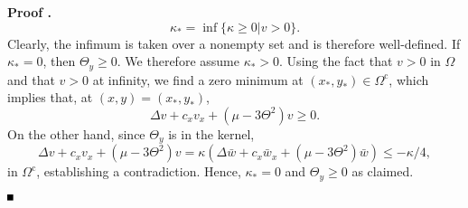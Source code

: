 \documentclass[10pt]{article}
\newenvironment{Proof}[1][\unskip]%
 {\begin{trivlist} \item[]{\bf Proof #1. }}%
 {\hspace*{\fill}$\rule{.4\baselineskip}{.4\baselineskip}$\end{trivlist}}
\renewcommand{\leq}{\leqslant}
\renewcommand{\geq}{\geqslant}
\begin{document}
\begin{Proof}
\[
\kappa_*=\inf\{\kappa\geq 0|v>0\}. 
\]
Clearly, the infimum is taken over a nonempty set and is therefore well-defined. If $\kappa_*=0$, then $\Theta_y\geq 0$. We therefore assume $\kappa_*>0$. Using the fact that $v>0$ in $\Omega$ and that $v>0$ at infinity, we find a zero minimum at $(x_*,y_*)\in \Omega^\mathrm{c}$, which implies that, at $(x,y)=(x_*,y_*)$,
\[
\Delta v+c_xv_x+(\mu-3\Theta^2)v\geq 0.
\]
On the other hand, since $\Theta_y$ is in the kernel,
\[
\Delta v+c_xv_x+(\mu-3\Theta^2)v= 
\kappa\left(\Delta \bar{w}+c_x\bar{w}_x+(\mu-3\Theta^2)\bar{w}\right)\leq -\kappa/4,
\]
in $\Omega^\mathrm{c}$, establishing a contradiction. Hence, $\kappa_*=0$ and $\Theta_y\geq 0$ as claimed. 
% 
% 
% 
% 
% 
% 


\end{Proof}
\end{document}
